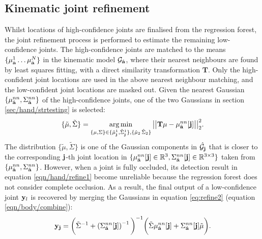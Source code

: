 \subsection{Kinematic joint refinement} 
\label{sec/hand/kjr} 

Whilst locations of high-confidence joints are finalised from the regression forest, the joint refinement process is performed to estimate the remaining low-confidence joints. 
The high-confidence joints are matched to the means $\{\mu_{\hat{\mathbf{a}}}^{1}\dots\mu_{\hat{\mathbf{a}}}^{N}\}$ in the kinematic model $\mathcal{G}_{\hat{\mathbf{a}}}$, where their nearest neighbours are found by least squares fitting, with a direct similarity transformation $\mathbf{T}$.  
Only the high-confident joint locations are used in the above nearest neighbour matching, and the low-confident joint locations are masked out. 
Given the nearest Gaussian $\{\mu_{\hat{\mathbf{a}}}^{nn}, \Sigma_{\hat{\mathbf{a}}}^{nn}\}$ of the high-confidence joints, one of the two Gaussians in section \ref{sec/hand/strtesting} is selected: 
\begin{equation}
		\{\tilde{\mu}, \tilde{\Sigma}\} 
		= \operatorname*{arg\,min}_{\{\mu, \Sigma\} \in \{\hat{\mu}_{\mathbf{j}}^{1}, \hat{\Sigma}_{\mathbf{j}}^{1}\},  \{\hat{\mu}_{2}\, \hat{\Sigma}_{2}\}}  
		\big|\big|\mathbf{T}\mu - \mu_{\hat{\mathbf{a}}}^{nn}[\mathbf{j}]\big|\big|^2_2.
		\label{eqn/hand/refine1}
\end{equation}
The distribution $\{\tilde{\mu}, \tilde{\Sigma}\}$ is one of the Gaussian components in $\hat{\mathcal{G}}_{\mathbf{j}}$ that is closer to the corresponding $\mathbf{j}$-th joint location in $\{\mu_{\hat{\mathbf{a}}}^{nn}[\mathbf{j}] \in \mathbb{R}^{3}, \Sigma_{\hat{\mathbf{a}}}^{nn}[\mathbf{j}] \in \mathbb{R}^{3\times3}\}$ taken from $\{ \mu_{\hat{\mathbf{a}}}^{nn}, \Sigma_{\hat{\mathbf{a}}}^{nn} \} $. However, when a joint is fully occluded, its detection result in equation \ref{eqn/hand/refine1} become unreliable because the regression forest does not consider complete occlusion.   
As a result, the final output of a low-confidence joint $\mathbf{y}_{l}$ is recovered by merging the Gaussians in equation \ref{eq:refine2} (\cf equation \ref{eqn/body/combine}): 
\begin{equation}
	\mathbf{y}_{\mathbf{j}} =
	\bigg(\tilde{\Sigma}^{-1} + \left(\Sigma_{\hat{\mathbf{a}}}^{nn}[\mathbf{j}]\right)^{-1}\bigg)^{-1}  \bigg( \tilde{\Sigma} \mu_{\hat{\mathbf{a}}}^{nn}[\mathbf{j}] + \Sigma_{\hat{\mathbf{a}}}^{nn}[\mathbf{j}]\tilde{\mu}\bigg).
	\label{eq:refine2}
\end{equation}

